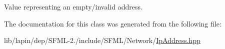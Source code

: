 Value representing an empty/invalid address. 



The documentation for this class was generated from the following file\-:\begin{DoxyCompactItemize}
\item 
lib/lapin/dep/\-S\-F\-M\-L-\/2./include/\-S\-F\-M\-L/\-Network/\hyperlink{lapin_2dep_2_s_f_m_l-2_83_2include_2_s_f_m_l_2_network_2_ip_address_8hpp}{Ip\-Address.\-hpp}\end{DoxyCompactItemize}
